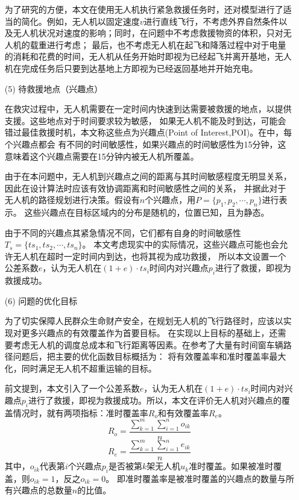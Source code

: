 \begin{itemize}
	\qquad 为了研究的方便，本文在使用无人机执行紧急救援任务时，还对模型进行了适当的简化。例如，无人机以固定速度$v$进行直线飞行，不考虑外界自然条件以及无人机状况对速度的影响；同时，在问题中不考虑救援物资的体积，只对无人机的载重进行考虑；
	最后，也不考虑无人机在起飞和降落过程中对于电量的消耗和花费的时间，无人机从任务开始时即视为已经起飞并离开基地，无人机在完成任务后只要到达基地上方即视为已经返回基地并开始充电。
	\item[(5)]
	待救援地点（兴趣点）


	\qquad 在救灾过程中，无人机需要在一定时间内快速到达需要被救援的地点，以提供支援。这些地点对于时间要求较为敏感，
	如果无人机不能及时到达，可能会错过最佳救援时机，本文称这些点为兴趣点(Point of Interest,POI)。在中，每个兴趣点都会
	有不同的时间敏感性，如果兴趣点的时间敏感性为15分钟，这意味着这个兴趣点需要在15分钟内被无人机所覆盖。


	\qquad 由于在本问题中，无人机到兴趣点之间的距离与其时间敏感程度无明显关系，因此在设计算法时应该有效协调距离和时间敏感性之间的关系，
	并据此对于无人机的路径规划进行决策。假设有$n$个兴趣点，用$P=\lbrace p_1, p_2, \cdots ,p_n \rbrace$进行表示。
	这些兴趣点在目标区域内的分布是随机的，位置已知，且为静态。


	\qquad 由于不同的兴趣点其紧急情况不同，它们都有自身的时间敏感性$T_s=\lbrace ts_1, ts_2, \cdots ,ts_n \rbrace$。
	本文考虑现实中的实际情况，这些兴趣点可能也会允许无人机在超时一定时间内到达，也将其视为成功救援，
	所以本文设置一个公差系数$e$，认为无人机在$(1+e) \cdot ts_i$时间内对兴趣点$p_i$进行了救援，即视为救援成功。


	\item[(6)]
	问题的优化目标

	\qquad 为了切实保障人民群众生命财产安全，在规划无人机的飞行路径时，应该以实现对更多兴趣点的有效覆盖作为首要目标。
	在实现以上目标的基础上，还需要考虑无人机的调度总成本和飞行距离等因素。在参考了大量有时间窗车辆路径问题后，把主要的优化函数目标概括为：
	将有效覆盖率和准时覆盖率最大化，同时满足无人机不超重运输的目标。

	\qquad 前文提到，本文引入了一个公差系数$e$，认为无人机在$(1+e) \cdot ts_i$时间内对兴趣点$p_i$进行了救援，即视为救援成功。所以，本文在评价无人机对兴趣点的覆盖情况时，就有两项指标：准时覆盖率$R_o$和有效覆盖率$R_e$。
	\begin{equation}
	R_o=\frac{\sum_{k=1}^m\sum_{i=1}^n o_{ik}}{n}
	\end{equation}
	\begin{equation}
	R_e=\frac{\sum_{k=1}^m\sum_{i=1}^n e_{ik}}{n}
	\end{equation}
	\qquad 其中，$o_{ik}$代表第$i$个兴趣点$p_i$是否被第$k$架无人机$u_k$准时覆盖。如果被准时覆盖，则$o_{ik} = 1$，反之$o_{ik} = 0$。
	即准时覆盖率是被准时覆盖的兴趣点的数量与所有兴趣点的总数量$n$的比值。



\end{itemize}
